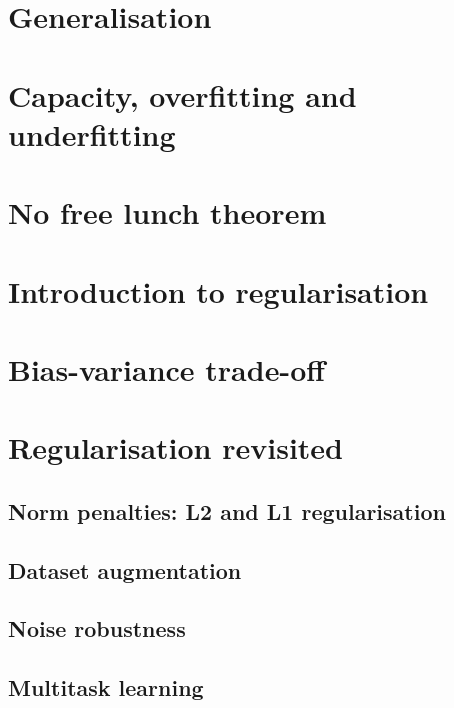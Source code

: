 \section{Generalisation}


\section{Capacity, overfitting and underfitting}



\section{No free lunch theorem}


\section{Introduction to regularisation}


\section{Bias-variance trade-off}







\section{Regularisation revisited}
\subsection{Norm penalties: L2 and L1 regularisation}
\subsection{Dataset augmentation}
\subsection{Noise robustness}
\subsection{Multitask learning}
